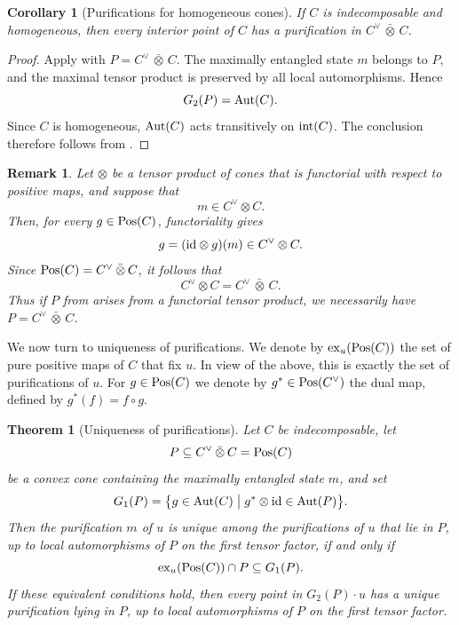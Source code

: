 \documentclass[11pt]{article}
\newcommand{\barabove}[1]{\hspace{2pt}\bar{#1}\hspace{2pt}}
\theoremstyle{result}
\newtheorem{theorem}{Theorem}[section]
\newtheorem{corollary}[corollary]{Corollary}
\theoremstyle{discussion}
\newtheorem{remark}[remark]{Remark}
\newcommand{\omax}{\barabove{\otimes}}
\begin{document}
\begin{corollary}[Purifications for homogeneous cones]
\label{cor:exhom}
    If $C$ is indecomposable and homogeneous, then every interior point of $C$
    has a purification in $C^\vee\omax C$.
\end{corollary}

\begin{proof}
    Apply  with $P=C^\vee\omax C$. The maximally
    entangled state $m$ belongs to $P$, and the maximal tensor product is
    preserved by all local automorphisms. Hence
    \[
        G_2(P)={\rm Aut}(C).
    \]
    Since $C$ is homogeneous, ${\rm Aut}(C)$ acts transitively on
    ${\rm int}(C)$. The conclusion therefore follows from
    .
\end{proof}

\begin{remark}
    Let $\otimes$ be a tensor product of cones that is functorial with respect to positive maps, and
    suppose that
    \[
        m\in C^\vee\otimes C.
    \]
    Then, for every $g\in{\rm Pos}(C)$, functoriality
    gives
    \[
        g=({\rm id}\otimes g)(m)
        \in C^\vee\otimes C.
    \]
    Since ${\rm Pos}(C)=C^\vee\omax C$, it follows that
    \[
        C^\vee\otimes C=C^\vee\omax C.
    \]
    Thus if $P$ from  arises from a functorial tensor product, we necessarily have $P=C^\vee\omax C$.
\end{remark}

We now turn to uniqueness of purifications.
We denote by
${\rm ex}_u({\rm Pos}(C))$ the set of pure positive maps of $C$ that fix $u$. In view of the above, this is exactly the set of purifications of $u$. For $g\in{\rm Pos}(C)$ we denote by  $g^*\in{\rm Pos}(C^\vee)$ the dual map, defined by $g^*(f)=f\circ g$.

\begin{theorem}[Uniqueness of purifications]
\label{thm:unique-purifications-subcone}
    Let $C$ be indecomposable, let
    \[
        P\subseteq C^\vee\omax C={\rm Pos}(C)
    \]
    be a convex cone containing the maximally entangled state $m$, and set
    \[
        G_1(P)=\bigl\{g\in{\rm Aut}(C)\bigm|
        g^*\otimes{\rm id}\in{\rm Aut}(P)\bigr\}.
    \]
    Then the purification $m$ of $u$ is unique among the purifications of
    $u$ that lie in $P$, up to local automorphisms of $P$ on the first
    tensor factor, if and only if
    \[
        {\rm ex}_u({\rm Pos}(C))\cap P\subseteq G_1(P).
    \]
    If these equivalent conditions hold, then every point in
    $G_2(P)\cdot u$ has a unique purification lying in $P$, up to local
    automorphisms of $P$ on the first tensor factor.
\end{theorem}
\end{document}
